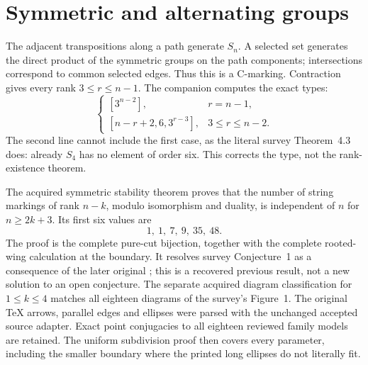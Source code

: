 \documentclass[11pt]{article}
\newcommand{\note}[1]{\marginpar{\raggedright\scriptsize #1}}
\begin{document}
\section{Symmetric and alternating groups}
The adjacent transpositions along a path generate $S_n$. A selected
set generates the direct product of the symmetric groups on the path
components; intersections correspond to common selected edges. Thus
this is a C-marking. Contraction gives every rank $3\le r\le n-1$.
The companion computes the exact types:
\[
 \begin{cases}
 [3^{n-2}],&r=n-1,\\
 [n-r+2,6,3^{r-3}],&3\le r\le n-2.
 \end{cases}                                                    \tag{1}
\]
\note{Correction}
The second line cannot include the first case, as the literal survey
Theorem~4.3 does: already $S_4$ has no element of order six.
This corrects the type, not the rank-existence theorem.

The acquired symmetric stability theorem proves that the number of
string markings of rank $n-k$, modulo isomorphism and duality, is independent
of $n$ for $n\ge2k+3$. Its first six values are
\[
                           1,\ 1,\ 7,\ 9,\ 35,\ 48.           \tag{2}
\]
The proof is the complete pure-cut bijection, together with the
complete rooted-wing calculation at the boundary. It resolves survey
Conjecture~1 as a consequence of the later original \cite{stability};
this is a recovered previous result, not a new solution to an open
conjecture. The separate acquired diagram classification for
$1\le k\le4$ matches all eighteen diagrams of the survey's Figure~1.
The original TeX arrows, parallel edges and ellipses were parsed with
the unchanged accepted source adapter. Exact point conjugacies to all
eighteen reviewed family models are retained. The uniform subdivision
proof then covers every parameter, including the smaller boundary
where the printed long ellipses do not literally fit.
\end{document}
